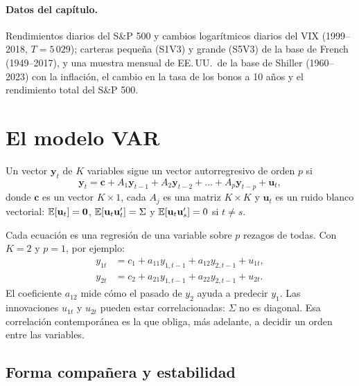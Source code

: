 \paragraph{Datos del capítulo.} Rendimientos diarios del S\&P 500 y cambios logarítmicos diarios del VIX
(1999--2018, $T=5\,029$); carteras pequeña (S1V3) y grande (S5V3) de la base de French (1949--2017), y una
muestra mensual de EE.\,UU.\ de la base de Shiller (1960--2023) con la inflación, el cambio en la tasa de los
bonos a 10 años y el rendimiento total del S\&P 500.

\section{El modelo VAR}

\begin{definicion}[VAR($p$)]
Un vector $\mathbf y_t$ de $K$ variables sigue un vector autorregresivo de orden $p$ si
\[
  \mathbf y_t=\mathbf c+A_1\mathbf y_{t-1}+A_2\mathbf y_{t-2}+\dots+A_p\mathbf y_{t-p}+\mathbf u_t,
\]
donde $\mathbf c$ es un vector $K\times1$, cada $A_j$ es una matriz $K\times K$ y $\mathbf u_t$ es un ruido
blanco vectorial: $\mathbb{E}[\mathbf u_t]=\mathbf 0$, $\mathbb{E}[\mathbf u_t\mathbf u_t']=\Sigma$ y
$\mathbb{E}[\mathbf u_t\mathbf u_s']=0$ si $t\ne s$.
\end{definicion}

Cada ecuación es una regresión de una variable sobre $p$ rezagos de todas. Con $K=2$ y $p=1$, por ejemplo:
\begin{align*}
  y_{1t} &= c_1+a_{11}y_{1,t-1}+a_{12}y_{2,t-1}+u_{1t},\\
  y_{2t} &= c_2+a_{21}y_{1,t-1}+a_{22}y_{2,t-1}+u_{2t}.
\end{align*}
El coeficiente $a_{12}$ mide cómo el pasado de $y_2$ ayuda a predecir $y_1$. Las innovaciones $u_{1t}$ y
$u_{2t}$ pueden estar correlacionadas: $\Sigma$ no es diagonal. Esa correlación contemporánea es la que obliga,
más adelante, a decidir un orden entre las variables.

\subsection{Forma compañera y estabilidad}

